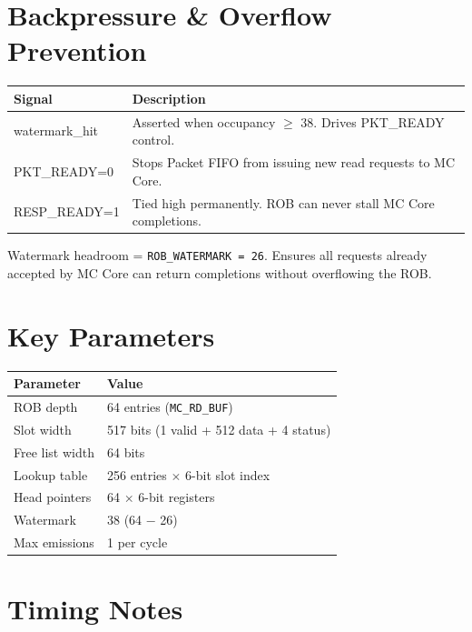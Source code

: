 \documentclass[11pt]{article}
\begin{document}
\section{Backpressure \& Overflow Prevention}

\begin{center}
\begin{tabularx}{\textwidth}{>{\ttfamily}l X}
\toprule
\textbf{Signal} & \textbf{Description} \\
\midrule
watermark\_hit  & Asserted when occupancy $\geq$ 38. Drives PKT\_READY control. \\
PKT\_READY=0    & Stops Packet FIFO from issuing new read requests to MC Core. \\
RESP\_READY=1   & Tied high permanently. ROB can never stall MC Core completions. \\
\bottomrule
\end{tabularx}
\end{center}

\medskip
\noindent Watermark headroom = \texttt{ROB\_WATERMARK = 26}. Ensures all requests already accepted by MC Core can return completions without overflowing the ROB.

\section{Key Parameters}

\begin{center}
\begin{tabular}{ll}
\toprule
\textbf{Parameter} & \textbf{Value} \\
\midrule
ROB depth         & 64 entries (\texttt{MC\_RD\_BUF}) \\
Slot width        & 517 bits (1 valid + 512 data + 4 status) \\
Free list width   & 64 bits \\
Lookup table      & 256 entries $\times$ 6-bit slot index \\
Head pointers     & 64 $\times$ 6-bit registers \\
Watermark         & 38 (64 $-$ 26) \\
Max emissions     & 1 per cycle \\
\bottomrule
\end{tabular}
\end{center}

\section{Timing Notes}
\end{document}
